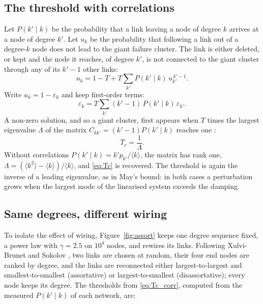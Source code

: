 \documentclass[11pt,a4paper]{article}
\theoremstyle{definition}
\theoremstyle{remark}
\newcommand{\avg}[1]{\langle #1 \rangle}
\begin{document}
\subsection{The threshold with correlations}

Let $P(k' \mid k)$ be the probability that a link leaving a node of degree $k$ arrives at a node of degree $k'$. Let $u_k$ be the probability that following a link out of a degree-$k$ node does not lead to the giant failure cluster. The link is either deleted, or kept and the node it reaches, of degree $k'$, is not connected to the giant cluster through any of its $k'-1$ other links:
\begin{equation}
u_k = 1 - T + T \sum_{k'} P(k' \mid k)\, u_{k'}^{\,k'-1}.
\end{equation}
Write $u_k = 1 - \varepsilon_k$ and keep first-order terms:
\begin{equation}
\varepsilon_k = T \sum_{k'} (k'-1)\, P(k' \mid k)\, \varepsilon_{k'} .
\end{equation}
A non-zero solution, and so a giant cluster, first appears when $T$ times the largest eigenvalue $\Lambda$ of the matrix $C_{kk'} = (k'-1)P(k' \mid k)$ reaches one \citep{BogunaPastorSatorras2002, VazquezMoreno2003}:
\begin{equation}
T_c = \frac{1}{\Lambda} .
\label{eq:Tc_corr}
\end{equation}
Without correlations $P(k' \mid k) = k' p_{k'} / \avg{k}$, the matrix has rank one, $\Lambda = (\avg{k^2} - \avg{k})/\avg{k}$, and \eqref{eq:Tc} is recovered. The threshold is again the inverse of a leading eigenvalue, as in May's bound: in both cases a perturbation grows when the largest mode of the linearised system exceeds the damping.

\subsection{Same degrees, different wiring}

To isolate the effect of wiring, Figure~\ref{fig:assort} keeps one degree sequence fixed, a power law with $\gamma = 2.5$ on $10^4$ nodes, and rewires its links. Following Xulvi-Brunet and Sokolov \citep{XulviBrunetSokolov2004}, two links are chosen at random, their four end nodes are ranked by degree, and the links are reconnected either largest-to-largest and smallest-to-smallest (assortative) or largest-to-smallest (disassortative); every node keeps its degree. The thresholds from \eqref{eq:Tc_corr}, computed from the measured $P(k' \mid k)$ of each network, are:
\end{document}
